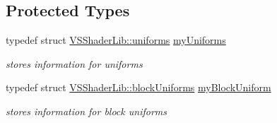 \subsection*{Protected Types}
\begin{DoxyCompactItemize}
\item 
typedef struct \hyperlink{struct_v_s_shader_lib_1_1uniforms}{V\+S\+Shader\+Lib\+::uniforms} \hyperlink{class_v_s_shader_lib_a3302b287e0686235d57404bd4587c1e6}{my\+Uniforms}
\begin{DoxyCompactList}\small\item\em stores information for uniforms \end{DoxyCompactList}\item 
typedef struct \hyperlink{struct_v_s_shader_lib_1_1block_uniforms}{V\+S\+Shader\+Lib\+::block\+Uniforms} \hyperlink{class_v_s_shader_lib_a0543003357c93b57bfe99a9aa3e0898d}{my\+Block\+Uniform}
\begin{DoxyCompactList}\small\item\em stores information for block uniforms \end{DoxyCompactList}\end{DoxyCompactItemize}
